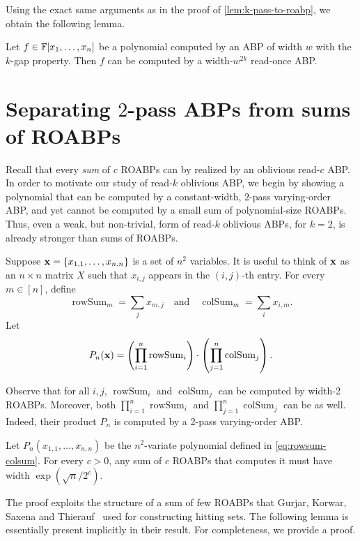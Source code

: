 \documentclass[11pt]{article}
\def\rowsum{\operatorname{rowSum}}
\def\colsum{\operatorname{colSum}}
\begin{document}
\noindent
Using the exact same arguments as in the proof of \autoref{lem:k-pass-to-roabp}, we obtain the following lemma.

\begin{lemmawp}
\label{lem:k-gap-to-roabp}
Let $f \in \F[x_1, \ldots, x_n]$ be a polynomial computed by an ABP of width $w$ with the $k$-gap property.
Then $f$ can be computed by a width-$w^{2k}$ read-once ABP.
\end{lemmawp}

\section{Separating $2$-pass ABPs from sums of ROABPs}
\label{sec:separation}

Recall that every {\em sum} of $c$ ROABPs can by realized by an oblivious read-$c$ ABP. In order to motivate our study of read-$k$ oblivious ABP, we begin by showing a polynomial that can be computed by a constant-width, $2$-pass varying-order ABP, and yet cannot be computed by a small sum of polynomial-size ROABPs. Thus, even a weak, but non-trivial, form of read-$k$ oblivious ABPs, for $k = 2$, is already stronger than sums of ROABPs.

Suppose $\mathbf{x}=\{x_{1,1},\ldots,x_{n,n}\}$ is a set of $n^2$ variables. It is useful to think of $\mathbf{x}$ as an $n \times n$ matrix $X$ such that $x_{i,j}$ appears in the $(i,j)$-th entry.
For every $m \in [n]$, define
\[
\rowsum_m = \sum_j x_{m,j} \quad \text{and} \quad \colsum_m = \sum_i x_{i,m}.
\]
Let
\begin{equation}
\label{eq:rowsum-colsum}
P_n(\vecx) = \inparen{\prod_{i=1}^n \rowsum_i} \cdot \inparen{\prod_{j=1}^n \colsum_j}.
\end{equation}

Observe that for all $i, j$, $\rowsum_i$ and $\colsum_j$ can be computed by width-2 ROABPs.  Moreover, both $\prod_{i=1}^n \rowsum_i$ and $\prod_{j=1}^n \colsum_j$ can be as well.  Indeed, their product $P_n$ is computed by a 2-pass varying-order ABP.

\begin{theorem}\label{thm:sep-2-pass-from-sum-ROABPs}
Let $P_n(x_{1,1},\ldots, x_{n,n})$ be the $n^2$-variate polynomial defined in \eqref{eq:rowsum-colsum}.
For every $c > 0$, any sum of $c$ ROABPs that computes it must have width $\exp(\sqrt{n}/2^{c})$. 
\end{theorem}

The proof exploits the structure of a sum of few ROABPs that Gurjar, Korwar, Saxena and Thierauf~\cite{GKST15} used for constructing hitting sets.
The following lemma is essentially present implicitly in their result. For completeness, we provide a proof.
\end{document}
